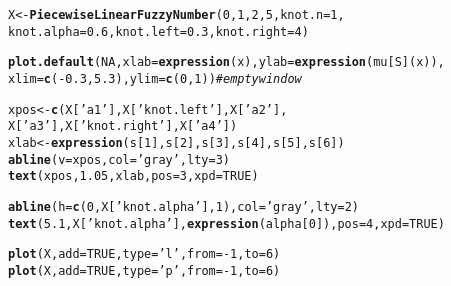 \documentclass[11pt]{article}\usepackage[]{graphicx}\usepackage[]{color}
\makeatletter
\newcommand{\hlnum}[1]{\textcolor[rgb]{0.686,0.059,0.569}{#1}}%
\newcommand{\hlstr}[1]{\textcolor[rgb]{0.192,0.494,0.8}{#1}}%
\newcommand{\hlcom}[1]{\textcolor[rgb]{0.678,0.584,0.686}{\textit{#1}}}%
\newcommand{\hlopt}[1]{\textcolor[rgb]{0,0,0}{#1}}%
\newcommand{\hlstd}[1]{\textcolor[rgb]{0.345,0.345,0.345}{#1}}%
\newcommand{\hlkwb}[1]{\textcolor[rgb]{0.69,0.353,0.396}{#1}}%
\newcommand{\hlkwc}[1]{\textcolor[rgb]{0.333,0.667,0.333}{#1}}%
\newcommand{\hlkwd}[1]{\textcolor[rgb]{0.737,0.353,0.396}{\textbf{#1}}}%
\newenvironment{kframe}{%
 \def\at@end@of@kframe{}%
 \ifinner\ifhmode%
  \def\at@end@of@kframe{\end{minipage}}%
  \begin{minipage}{\columnwidth}%
 \fi\fi%
 \def\FrameCommand##1{\hskip\@totalleftmargin \hskip-\fboxsep
 \colorbox{shadecolor}{##1}\hskip-\fboxsep
     \hskip-\linewidth \hskip-\@totalleftmargin \hskip\columnwidth}%
 \MakeFramed {\advance\hsize-\width
   \@totalleftmargin\z@ \linewidth\hsize
   \@setminipage}}%
 {\par\unskip\endMakeFramed%
 \at@end@of@kframe}
\newenvironment{knitrout}{}{} %
\makeatother
\begin{document}
\begin{knitrout}\small
{}\color{fgcolor}\begin{kframe}
\begin{alltt}
\hlstd{X} \hlkwb{<-} \hlkwd{PiecewiseLinearFuzzyNumber}\hlstd{(}\hlnum{0}\hlstd{,} \hlnum{1}\hlstd{,} \hlnum{2}\hlstd{,} \hlnum{5}\hlstd{,} \hlkwc{knot.n}\hlstd{=}\hlnum{1}\hlstd{,}
   \hlkwc{knot.alpha}\hlstd{=}\hlnum{0.6}\hlstd{,} \hlkwc{knot.left}\hlstd{=}\hlnum{0.3}\hlstd{,} \hlkwc{knot.right}\hlstd{=}\hlnum{4}\hlstd{)}

\hlkwd{plot.default}\hlstd{(}\hlnum{NA}\hlstd{,} \hlkwc{xlab}\hlstd{=}\hlkwd{expression}\hlstd{(x),} \hlkwc{ylab}\hlstd{=}\hlkwd{expression}\hlstd{(mu[S](x)),}
   \hlkwc{xlim}\hlstd{=}\hlkwd{c}\hlstd{(}\hlopt{-}\hlnum{0.3}\hlstd{,}\hlnum{5.3}\hlstd{),} \hlkwc{ylim}\hlstd{=}\hlkwd{c}\hlstd{(}\hlnum{0}\hlstd{,}\hlnum{1}\hlstd{))} \hlcom{# empty window}

\hlstd{xpos} \hlkwb{<-} \hlkwd{c}\hlstd{(X[}\hlstr{'a1'}\hlstd{], X[}\hlstr{'knot.left'}\hlstd{],  X[}\hlstr{'a2'}\hlstd{],}
          \hlstd{X[}\hlstr{'a3'}\hlstd{], X[}\hlstr{'knot.right'}\hlstd{], X[}\hlstr{'a4'}\hlstd{])}
\hlstd{xlab} \hlkwb{<-} \hlkwd{expression}\hlstd{(s[}\hlnum{1}\hlstd{], s[}\hlnum{2}\hlstd{], s[}\hlnum{3}\hlstd{], s[}\hlnum{4}\hlstd{], s[}\hlnum{5}\hlstd{], s[}\hlnum{6}\hlstd{])}
\hlkwd{abline}\hlstd{(}\hlkwc{v}\hlstd{=xpos,} \hlkwc{col}\hlstd{=}\hlstr{'gray'}\hlstd{,} \hlkwc{lty}\hlstd{=}\hlnum{3}\hlstd{)}
\hlkwd{text}\hlstd{(xpos,} \hlnum{1.05}\hlstd{, xlab,} \hlkwc{pos}\hlstd{=}\hlnum{3}\hlstd{,} \hlkwc{xpd}\hlstd{=}\hlnum{TRUE}\hlstd{)}

\hlkwd{abline}\hlstd{(}\hlkwc{h}\hlstd{=}\hlkwd{c}\hlstd{(}\hlnum{0}\hlstd{, X[}\hlstr{'knot.alpha'}\hlstd{],} \hlnum{1}\hlstd{),} \hlkwc{col}\hlstd{=}\hlstr{'gray'}\hlstd{,} \hlkwc{lty}\hlstd{=}\hlnum{2}\hlstd{)}
\hlkwd{text}\hlstd{(}\hlnum{5.1}\hlstd{, X[}\hlstr{'knot.alpha'}\hlstd{],} \hlkwd{expression}\hlstd{(alpha[}\hlnum{0}\hlstd{]),} \hlkwc{pos}\hlstd{=}\hlnum{4}\hlstd{,} \hlkwc{xpd}\hlstd{=}\hlnum{TRUE}\hlstd{)}

\hlkwd{plot}\hlstd{(X,} \hlkwc{add}\hlstd{=}\hlnum{TRUE}\hlstd{,} \hlkwc{type}\hlstd{=}\hlstr{'l'}\hlstd{,} \hlkwc{from}\hlstd{=}\hlopt{-}\hlnum{1}\hlstd{,} \hlkwc{to}\hlstd{=}\hlnum{6}\hlstd{)}
\hlkwd{plot}\hlstd{(X,} \hlkwc{add}\hlstd{=}\hlnum{TRUE}\hlstd{,} \hlkwc{type}\hlstd{=}\hlstr{'p'}\hlstd{,} \hlkwc{from}\hlstd{=}\hlopt{-}\hlnum{1}\hlstd{,} \hlkwc{to}\hlstd{=}\hlnum{6}\hlstd{)}
\end{alltt}
\end{kframe}
\end{knitrout}
\end{document}
